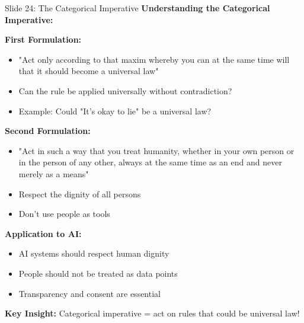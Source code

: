 \documentclass[8pt]{beamer}
\begin{document}
	\begin{frame}{Slide 24: The Categorical Imperative}
		\fontsize{6.5}{7.5}\selectfont
		\textbf{Understanding the Categorical Imperative:}
		
		\vspace{0.1cm}
		\textbf{First Formulation:}
		\begin{itemize}
			\item "Act only according to that maxim whereby you can at the same time will that it should become a universal law"
			\item Can the rule be applied universally without contradiction?
			\item Example: Could "It's okay to lie" be a universal law?
		\end{itemize}
		
		\vspace{0.1cm}
		\textbf{Second Formulation:}
		\begin{itemize}
			\item "Act in such a way that you treat humanity, whether in your own person or in the person of any other, always at the same time as an end and never merely as a means"
			\item Respect the dignity of all persons
			\item Don't use people as tools
		\end{itemize}
		
		\vspace{0.1cm}
		\textbf{Application to AI:}
		\begin{itemize}
			\item AI systems should respect human dignity
			\item People should not be treated as data points
			\item Transparency and consent are essential
		\end{itemize}
		
		\textcolor{myblue}{\textbf{Key Insight:}} Categorical imperative = \textcolor{myblue}{act on rules that could be universal law}!
	\end{frame}
	
\end{document}
